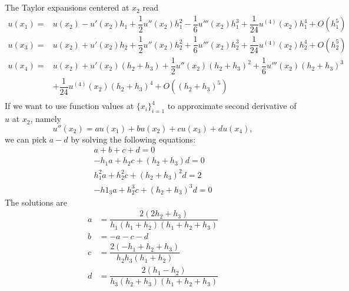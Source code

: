 \documentclass[11pt]{article}
\begin{document}
\maketitle
\pagebreak
\section{}
\subsection{}
The Taylor expansions centered at $x_2$ read
\begin{equation}\begin{split}
u(x_1) =& u(x_2) - u'(x_2)h_1 + \dfrac12 u''(x_2)h_1^2-\dfrac16u'''(x_2)h_1^3+\dfrac1{24}u^{(4)}(x_2)h_1^4+O(h_1^5)\\
u(x_3) =& u(x_2) + u'(x_2)h_2 + \dfrac12 u''(x_2)h_2^2+\dfrac16u'''(x_2)h_2^3+\dfrac1{24}u^{(4)}(x_2)h_2^4+O(h_2^5)\\
u(x_4) =& u(x_2) + u'(x_2)(h_2+h_3) + \dfrac12 u''(x_2)(h_2+h_3)^2+\dfrac16u'''(x_2)(h_2+h_3)^3 \\
	& +\dfrac1{24}u^{(4)}(x_2)(h_2+h_3)^4+O((h_2+h_3)^5) \\
\end{split}\end{equation} 
If we want to use function values at $\{x_i\}_{i=1}^4$ to approximate second derivative of $u$ at $x_2$, namely
$$u''(x_2) = au(x_1)+bu(x_2)+cu(x_3)+du(x_4),$$
we can pick $a-d$ by solving the following equations:
\begin{equation}\begin{split}
a+b+c+d = 0 \\
-h_1a+h_2c+(h_2+h_3)d = 0 \\
h_1^2a + h_2^2c+(h_2+h_3)^2d = 2 \\
-h1_3a+h_2^3c+(h_2+h_3)^3d = 0
\end{split}\end{equation} 
The solutions are
\begin{equation}\begin{split}
a &= \dfrac{2(2h_2+h_3)}{h_1(h_1+h_2)(h_1+h_2+h_3)} \\
b &= -a -c -d\\
c &= \dfrac{2(-h_1+h_2+h_3)}{h_2h_3(h_1+h_2)} \\
d &= \dfrac{2(h_1-h_2)}{h_3(h_2+h_3)(h_1+h_2+h_3)}
\end{split}\nonumber\end{equation} 

\subsection{}
\end{document}
